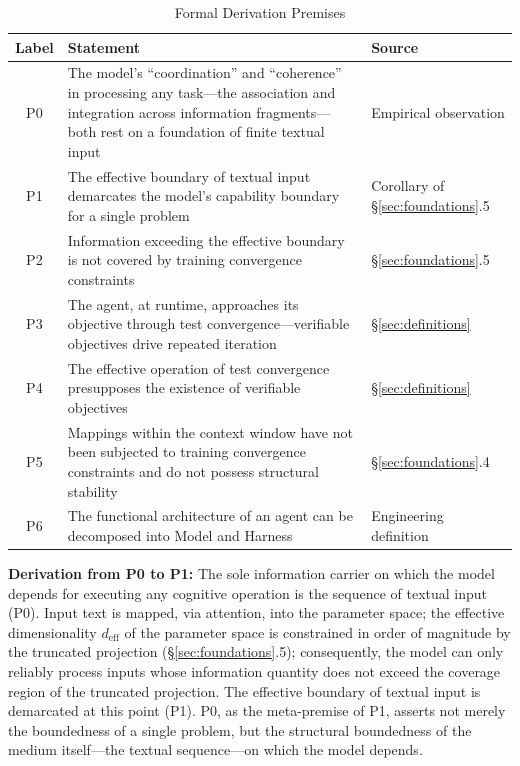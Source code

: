 \documentclass[11pt,a4paper]{article}
\theoremstyle{definition}
\begin{document}
\begin{table}[H]
\centering
\caption{Formal Derivation Premises}
\begin{tabular}{@{}c@{}p{7.5cm}@{}p{3.5cm}@{}}
\toprule
\textbf{Label} & \textbf{Statement} & \textbf{Source} \\
\midrule
P0 & The model's ``coordination'' and ``coherence'' in processing any task---the association and integration across information fragments---both rest on a foundation of finite textual input & Empirical observation \\
P1 & The effective boundary of textual input demarcates the model's capability boundary for a single problem & Corollary of \S\ref{sec:foundations}.5 \\
P2 & Information exceeding the effective boundary is not covered by training convergence constraints & \S\ref{sec:foundations}.5 \\
P3 & The agent, at runtime, approaches its objective through test convergence---verifiable objectives drive repeated iteration & \S\ref{sec:definitions} \\
P4 & The effective operation of test convergence presupposes the existence of verifiable objectives & \S\ref{sec:definitions} \\
P5 & Mappings within the context window have not been subjected to training convergence constraints and do not possess structural stability & \S\ref{sec:foundations}.4 \\
P6 & The functional architecture of an agent can be decomposed into Model and Harness & Engineering definition \\
\bottomrule
\end{tabular}
\end{table}

\textbf{Derivation from P0 to P1:} The sole information carrier on which the model depends for executing any cognitive operation is the sequence of textual input (P0). Input text is mapped, via attention, into the parameter space; the effective dimensionality $d_{\text{eff}}$ of the parameter space is constrained in order of magnitude by the truncated projection (\S\ref{sec:foundations}.5); consequently, the model can only reliably process inputs whose information quantity does not exceed the coverage region of the truncated projection. The effective boundary of textual input is demarcated at this point (P1). P0, as the meta-premise of P1, asserts not merely the boundedness of a single problem, but the structural boundedness of the medium itself---the textual sequence---on which the model depends.
\end{document}
